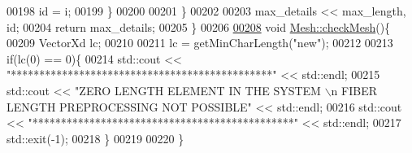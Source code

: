 \begin{DoxyCode}
00198             \textcolor{keywordtype}{id} = i;
00199         \}
00200 
00201     \}
00202 
00203     max\_details << max\_length, id;
00204     \textcolor{keywordflow}{return} max\_details;
00205 \}
00206 
\hyperlink{class_mesh_a894e41dd4280dfba75406eb8d0338a8e}{00208} \textcolor{keywordtype}{void} \hyperlink{class_mesh_a894e41dd4280dfba75406eb8d0338a8e}{Mesh::checkMesh}()\{
00209     VectorXd lc;
00210 
00211     lc = getMinCharLength(\textcolor{stringliteral}{"new"});
00212 
00213     \textcolor{keywordflow}{if}(lc(0) == 0)\{
00214         std::cout << \textcolor{stringliteral}{"**********************************************"} << std::endl;
00215         std::cout << \textcolor{stringliteral}{"ZERO LENGTH ELEMENT IN THE SYSTEM \(\backslash\)n FIBER LENGTH PREPROCESSING NOT POSSIBLE"} << 
      std::endl;
00216         std::cout << \textcolor{stringliteral}{"**********************************************"} << std::endl;
00217         std::exit(-1);
00218     \}
00219 
00220 \}
\end{DoxyCode}
